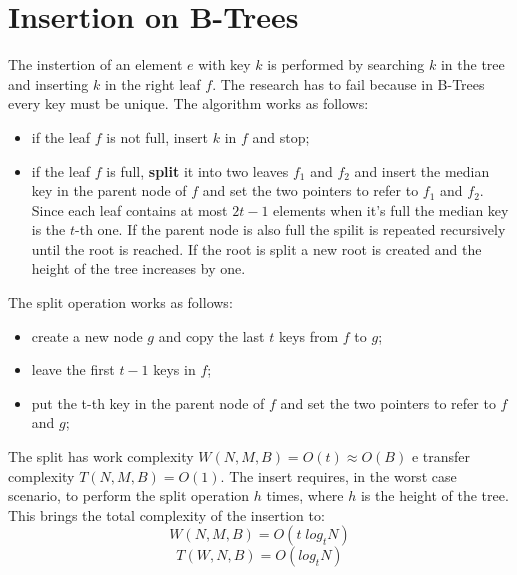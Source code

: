 \documentclass{report}
\begin{document}
\section{Insertion on B-Trees}
The instertion of an element \(e\) with key \(k\) is performed by searching \(k\) in the tree and inserting \(k\) in the right leaf \(f\). The research has to fail because in B-Trees every key must be unique. The algorithm works as follows:
\begin{itemize}
    \item if the leaf \(f\) is not full, insert \(k\) in \(f\) and stop;
    \item if the leaf \(f\) is full, \textbf{split} it into two leaves \(f_1\) and \(f_2\) and insert the median key in the parent node of \(f\) and set the two pointers to refer to \(f_1\) and \(f_2\). Since each leaf contains at most \(2t-1\) elements when it's full the median key is the \(t\)-th one. If the parent node is also full the spilit is repeated recursively until the root is reached. If the root is split a new root is created and the height of the tree increases by one.
\end{itemize}
\noindent The split operation works as follows:
\begin{itemize}
    \item create a new node \(g\) and copy the last \(t\) keys from \(f\) to \(g\);
    \item leave the first \(t-1\) keys in \(f\);
    \item put the t-th key in the parent node of \(f\) and set the two pointers to refer to \(f\) and \(g\);
\end{itemize}
The split has work complexity \(W(N,M,B) = O(t) \approx O(B)\) e transfer complexity \(T(N,M,B) = O(1)\). The insert requires, in the worst case scenario, to perform the split operation \(h\) times, where \(h\) is the height of the tree. This brings the total complexity of the insertion to:
\begin{equation}
    W(N,M,B) = O(t \; log_t N)
\end{equation}
\begin{equation}
    T(W,N,B) = O(log_t N)
\end{equation}
\end{document}
